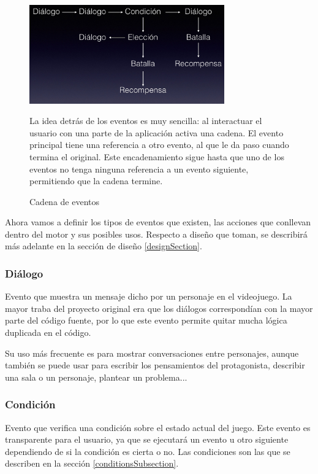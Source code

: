 \begin{figure}[h]
	\caption{Cadena de eventos}
	\centering
	\includegraphics[width=0.75\textwidth]{include/eventsChainExample.jpg}
	
	La idea detrás de los eventos es muy sencilla: al interactuar el usuario con una parte de la aplicación activa una cadena. El evento principal tiene una referencia a otro evento, al que le da paso cuando termina el original. Este encadenamiento sigue hasta que uno de los eventos no tenga ninguna referencia a un evento siguiente, permitiendo que la cadena termine.
\end{figure}

Ahora vamos a definir los tipos de eventos que existen, las acciones que conllevan dentro del motor y sus posibles usos. Respecto a diseño que toman, se describirá más adelante en la sección de diseño \ref{designSection}. 

\subsubsection{Diálogo}
Evento que muestra un mensaje dicho por un personaje en el videojuego. La mayor traba del proyecto original era que los diálogos correspondían con la mayor parte del código fuente, por lo que este evento permite quitar mucha lógica duplicada en el código.

Su uso más frecuente es para mostrar conversaciones entre personajes, aunque también se puede usar para escribir los pensamientos del protagonista, describir una sala o un personaje, plantear un problema...

\subsubsection{Condición}
Evento que verifica una condición sobre el estado actual del juego. Este evento es transparente para el usuario, ya que se ejecutará un evento u otro siguiente dependiendo de si la condición es cierta o no. Las condiciones son las que se describen en la sección \ref{conditionsSubsection}.

